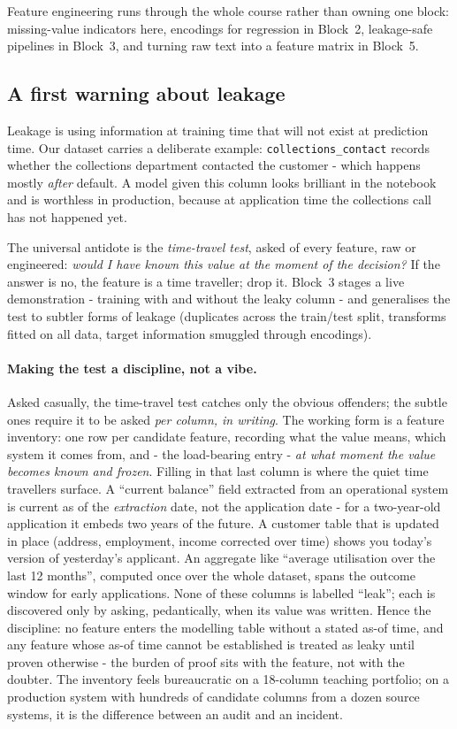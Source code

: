 \documentclass[11pt,a4paper]{article}
\begin{document}
Feature engineering runs through the whole course rather than owning one
block: missing-value indicators here, encodings for regression in Block~2,
leakage-safe pipelines in Block~3, and turning raw text into a feature
matrix in Block~5.

\subsection{A first warning about leakage}
\label{sec:leakage}
Leakage is using information at training time that will not exist at
prediction time. Our dataset carries a deliberate example:
\texttt{collections\_contact} records whether the collections department
contacted the customer - which happens mostly \emph{after} default. A
model given this column looks brilliant in the notebook and is worthless in
production, because at application time the collections call has not
happened yet.

The universal antidote is the \emph{time-travel test}, asked of every
feature, raw or engineered: \emph{would I have known this value at the
moment of the decision?} If the answer is no, the feature is a time
traveller; drop it. Block~3 stages a live demonstration - training with
and without the leaky column - and generalises the test to subtler forms
of leakage (duplicates across the train/test split, transforms fitted on all
data, target information smuggled through encodings).

\paragraph{Making the test a discipline, not a vibe.} Asked casually, the
time-travel test catches only the obvious offenders; the subtle ones
require it to be asked \emph{per column, in writing}. The working form is
a feature inventory: one row per candidate feature, recording what the
value means, which system it comes from, and - the load-bearing entry -
\emph{at what moment the value becomes known and frozen}. Filling in that
last column is where the quiet time travellers surface. A ``current
balance'' field extracted from an operational system is current as of the
\emph{extraction} date, not the application date - for a two-year-old
application it embeds two years of the future. A customer table that is
updated in place (address, employment, income corrected over time) shows
you today's version of yesterday's applicant. An aggregate like ``average
utilisation over the last 12 months'', computed once over the whole
dataset, spans the outcome window for early applications. None of these
columns is labelled ``leak''; each is discovered only by asking, pedantically,
when its value was written. Hence the discipline: no feature enters the
modelling table without a stated as-of time, and any feature whose as-of
time cannot be established is treated as leaky until proven otherwise -
the burden of proof sits with the feature, not with the doubter. The
inventory feels bureaucratic on a 18-column teaching portfolio; on a
production system with hundreds of candidate columns from a dozen source
systems, it is the difference between an audit and an incident.
\end{document}
